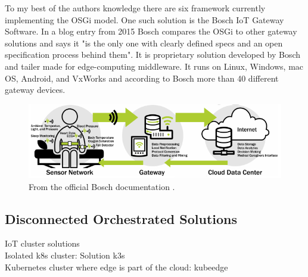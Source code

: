 To my best of the authors knowledge there are six framework currently implementing the OSGi model. One such solution is the Bosch IoT Gateway Software\cite{BoschIoT13:online}. In a blog entry from 2015 Bosch compares the OSGi to other gateway solutions and says it "is the only one with clearly defined specs and an open specification process behind them"\cite{boschBlogOSGi69:online}. It is proprietary solution developed by Bosch and tailer made for edge-computing middleware. It runs on Linux, Windows, mac OS, Android, and VxWorks and according to Bosch more than 40 different gateway devices\cite{BoschIoT13:online}.

\begin{figure}[h!]
    \centering
    \includegraphics[scale=1.8]{figures/iotSetup.png}
    \caption{From the official Bosch documentation \cite{BoschIoT13:online}.}
    \label{fig:boschIoTGatewaySetup}
\end{figure}





\subsection{Disconnected Orchestrated Solutions}
IoT cluster solutions\\
Isolated k8s cluster: Solution k3s\\
Kubernetes cluster where edge is part of the cloud: kubeedge\\



